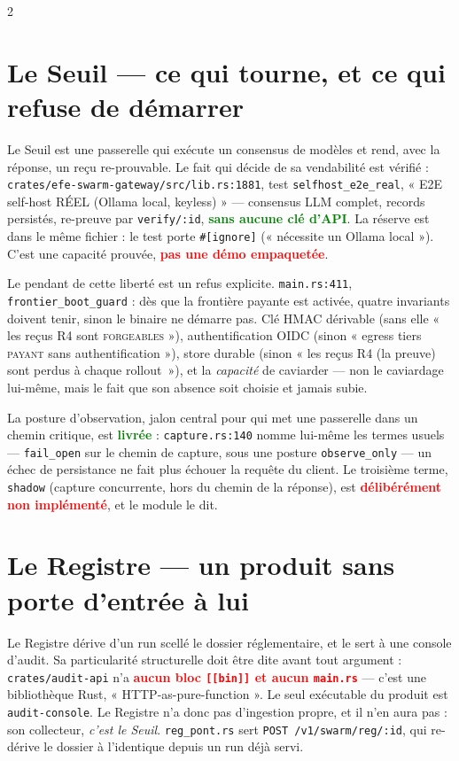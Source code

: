 \documentclass[9pt]{extarticle}
\newcommand{\code}[1]{\texttt{\footnotesize #1}}
\newcommand{\ok}[1]{\textcolor{green}{\textbf{#1}}}
\newcommand{\ko}[1]{\textcolor{red}{\textbf{#1}}}
\begin{document}
\begin{multicols}{2}

\section{Le Seuil — ce qui tourne, et ce qui refuse de démarrer}
Le Seuil est une passerelle qui exécute un consensus de modèles et rend, avec la réponse, un reçu re-prouvable. Le fait qui décide de sa vendabilité est vérifié : \code{crates/efe-swarm-gateway/src/lib.rs:1881}, test \code{selfhost\_e2e\_real}, « E2E self-host RÉEL (Ollama local, keyless) » — consensus LLM complet, records persistés, re-preuve par \code{verify/:id}, \ok{sans aucune clé d'API}. La réserve est dans le même fichier : le test porte \code{\#[ignore]} (« nécessite un Ollama local »). C'est une capacité prouvée, \ko{pas une démo empaquetée}.

Le pendant de cette liberté est un refus explicite. \code{main.rs:411}, \code{frontier\_boot\_guard} : dès que la frontière payante est activée, quatre invariants doivent tenir, sinon le binaire ne démarre pas. Clé HMAC dérivable (sans elle « les reçus R4 sont \textsc{forgeables} »), authentification OIDC (sinon « egress tiers \textsc{payant} sans authentification »), store durable (sinon « les reçus R4 (la preuve) sont perdus à chaque rollout~»), et la \emph{capacité} de caviarder — non le caviardage lui-même, mais le fait que son absence soit choisie et jamais subie.

La posture d'observation, jalon central pour qui met une passerelle dans un chemin critique, est \ok{livrée} : \code{capture.rs:140} nomme lui-même les termes usuels — \code{fail\_open} sur le chemin de capture, sous une posture \code{observe\_only} — un échec de persistance ne fait plus échouer la requête du client. Le troisième terme, \code{shadow} (capture concurrente, hors du chemin de la réponse), est \ko{délibérément non implémenté}, et le module le dit.

\section{Le Registre — un produit sans porte d'entrée à lui}
Le Registre dérive d'un run scellé le dossier réglementaire, et le sert à une console d'audit. Sa particularité structurelle doit être dite avant tout argument : \code{crates/audit-api} n'a \ko{aucun bloc \code{[[bin]]} et aucun \code{main.rs}} — c'est une bibliothèque Rust, « HTTP-as-pure-function ». Le seul exécutable du produit est \code{audit-console}. Le Registre n'a donc pas d'ingestion propre, et il n'en aura pas : son collecteur, \emph{c'est le Seuil}. \code{reg\_pont.rs} sert \code{POST /v1/swarm/reg/:id}, qui re-dérive le dossier à l'identique depuis un run déjà servi.


\end{multicols}
\end{document}

